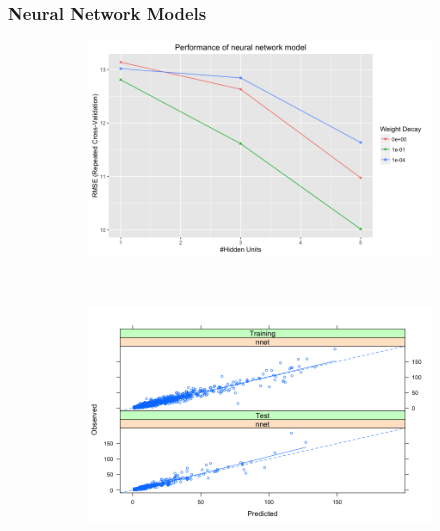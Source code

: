 \documentclass[letterpaper,12pt,titlepage,oneside,final]{report}
\begin{document}
            \subsubsection {Neural Network Models}
                \begin{figure}[!ht]
                \begin{subfigure}[t]{0.5\textwidth}
                    \centering
                    \includegraphics[width=\textwidth]{nnetresults}
                    \caption{}
                    \label{nnetresults}
                \end{subfigure}%
                    ~ 
                \begin{subfigure}[t]{0.5\textwidth}
                    \centering
                    \includegraphics[width=\textwidth]{nnet_pred_obs}
                    \caption{}
                    \label{nnet_pred_obs}
                \end{subfigure}
                \end{figure}
\end{document}
